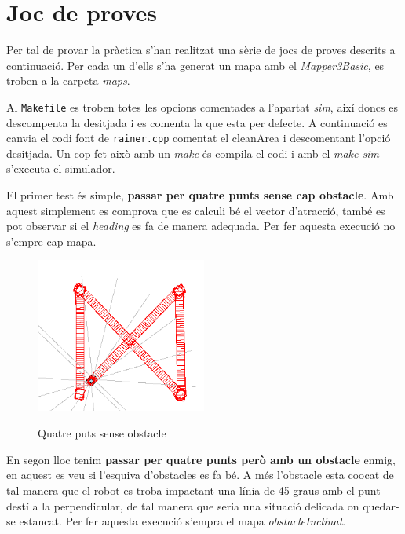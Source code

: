 \section{Joc de proves}

Per tal de provar la pràctica s'han realitzat una sèrie de jocs de proves
descrits a continuació. Per cada un d'ells s'ha generat un mapa amb el \emph{Mapper3Basic},
es troben a la carpeta \emph{maps}.

Al \texttt{Makefile} es troben totes les opcions comentades a l'apartat \emph{sim}, així doncs
es descompenta la desitjada i es comenta la que esta per defecte. A continuació es canvia el codi font
de \texttt{rainer.cpp} comentat el cleanArea i descomentant l'opció desitjada. Un cop fet això amb un \emph{make}
és compila el codi i amb el \emph{make sim} s'executa el simulador.

El primer test és simple, \textbf{passar per quatre punts sense cap obstacle}. Amb aquest simplement es comprova que es calculi
bé el vector d'atracció, també es pot observar si el \emph{heading} es fa de manera adequada. Per fer aquesta 
execució no s'empre cap mapa.

\begin{figure}[H]
\begin{center}\label{4punts}
 \includegraphics[width=0.5\textwidth]{diagrames/figures/4punts.png}
\end{center}
  \caption{Quatre puts sense obstacle}
\end{figure}


En segon lloc tenim \textbf{passar per quatre punts però amb un obstacle} enmig, en aquest es veu si l'esquiva d'obstacles
es fa bé. A més l'obstacle esta co\lgem ocat de tal manera que el robot es troba impactant una línia de 45 graus
amb el punt destí a la perpendicular, de tal manera que seria una situació delicada on quedar-se estancat.
Per fer aquesta execució s'empra el mapa \emph{obstacleInclinat}.

